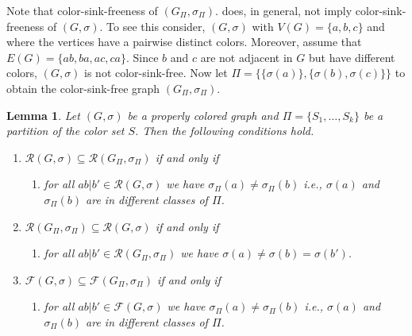 \documentclass[final,3p,times]{elsarticle}
\newtheorem{lemma}[theorem]{Lemma}%
\begin{document}
Note that color-sink-freeness of  $(G_{\Pi},\sigma_{\Pi})$.
does, in general, not imply  color-sink-freeness of  $(G,\sigma)$.
To see this consider,  $(G,\sigma)$ with $V(G) = \{a,b,c\}$
and where the vertices have a pairwise distinct colors. 
Moreover, assume that $E(G) = \{ab,ba,ac,ca\}$. 
Since $b$ and $c$ are not adjacent in $G$ but have different
colors,  $(G,\sigma)$ is not color-sink-free. 
Now let $\Pi = \{\{\sigma(a)\},\{\sigma(b),\sigma(c)\}\}$
to obtain the color-sink-free graph $(G_{\Pi},\sigma_{\Pi})$.


\begin{lemma}\label{lem:R-Ri}
	Let $(G,\sigma)$ be a properly colored graph and $\Pi =  \{S_1,\dots,S_k\}$
	be a partition of the color set $S$. Then the following conditions hold. 
	
	\begin{enumerate}
 		\item $\mathscr{R}(G,\sigma) \subseteq \mathscr{R}(G_\Pi,\sigma_\Pi)$
 			  	  if and only if 
	
			\begin{enumerate}[noitemsep]
 			  	 \item[(R1):]  for all $ab|b' \in \mathscr{R}(G,\sigma)$ we have 
 			  	 $\sigma_\Pi(a) \neq  \sigma_\Pi(b)$ 
			      i.e., $\sigma(a)$ and $\sigma_\Pi(b)$ are in different classes
			      of  $\Pi$. 	
			\end{enumerate}			      

 		\item $\mathscr{R}(G_\Pi,\sigma_\Pi)  \subseteq  \mathscr{R}(G,\sigma)$
 			  	  if and only if 			  	   
	
			\begin{enumerate}[noitemsep]
 			  	 \item[(R2):] for all $ab|b' \in \mathscr{R}(G_\Pi,\sigma_\Pi)$ we have 
 			  	 $\sigma(a) \neq \sigma(b) = \sigma(b')$. 
			\end{enumerate}			      
			      
 		\item $\mathscr{F}(G,\sigma) \subseteq \mathscr{F}(G_\Pi,\sigma_\Pi)$
 			  	  if and only if 
	
			\begin{enumerate}[noitemsep]
 			  	 \item[(F1):]  for all $ab|b' \in \mathscr{F}(G,\sigma)$ we have 
 			  	 $\sigma_\Pi(a) \neq  \sigma_\Pi(b)$ 
			      i.e., $\sigma(a)$ and $\sigma_\Pi(b)$ are in different classes
			      of  $\Pi$. 	
			\end{enumerate}			      


\end{enumerate}
\end{lemma}
\end{document}
